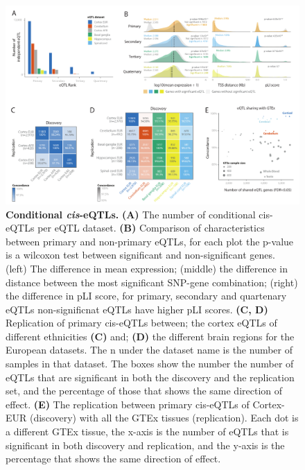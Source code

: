 \begin{figure}[H]
	\includegraphics[width=\textwidth]{chapters/chapter5-brain-eqtls/img/2021-02-11-fig3-ciseqtls-v12.pdf}
	\caption{\textbf{Conditional \emph{cis}-eQTLs.} \textbf{(A)} The number of conditional cis-eQTLs per eQTL dataset. \textbf{(B)} Comparison of characteristics between primary and non-primary eQTLs, for each plot the p-value is a wilcoxon test between significant and non-significant genes. (left) The difference in mean expression; (middle) the difference in distance between the most significant SNP-gene combination; (right) the difference in pLI score, for primary, secondary and quartenary eQTLs non-significnat eQTLs have higher pLI scores.  \textbf{(C, D)} Replication of primary cis-eQTLs between; the cortex eQTLs of different ethnicities \textbf{(C)} and; \textbf{(D)} the different brain regions for the European datasets. The n under the dataset name is the number of samples in that dataset. The boxes show the number the number of eQTLs that are significant in both the discovery and the replication set, and the percentage of those that shows the same direction of effect. \textbf{(E)} The replication between primary cis-eQTLs of Cortex-EUR (discovery) with all the GTEx tissues (replication). Each dot is a different GTEx tissue, the x-axis is the number of eQTLs that is significant in both discovery and replication, and the y-axis is the percentage that shows the same direction of effect. }
	\label{metabrain_fig3}
\end{figure}


